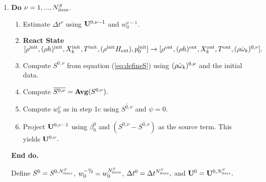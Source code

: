\begin{enumerate}
\renewcommand{\theenumi}{{\bf \alph{enumi}}}
\renewcommand{\labelenumii}{\roman{enumii}.}

\item {\bf Do} {$\nu = 1,...,N_{\rm iters}^{S}$.}
  \begin{enumerate}

  \item Estimate $\Delta t^\nu$ using ${\bf U}^{0,\nu-1}$ and $w_0^{\nu-1}.$

  \item {\bf React State}$[ \rho^{\mathrm{init}},(\rho h)^{\mathrm{init}}, X_k^{\mathrm{init}}, T^{\mathrm{init}}, 
(\rho^{\mathrm{init}} {H_{\rm ext}}), p_0^{\mathrm{init}}] \rightarrow [\rho^{\mathrm{out}}, (\rho h)^{\mathrm{out}}, 
X_k^{\mathrm{out}}, T^{\mathrm{out}}, (\rho \dot{\omega}_k)^{0,\nu} ].$

  \item Compute $S^{0,\nu}$ from equation (\ref{eq:defineS}) 
        using $(\rho \dot{\omega}_k)^{0,\nu}$ and the initial data.

  \item Compute $\overline{S^{0,\nu}} = {\mathrm{\bf Avg}} (S^{0,\nu}).$

  \item Compute $w_0^{\nu}$ as in step 1c using $\overline{S^{0,\nu}}$ and $\psi=0$.
        
  \item Project ${\bf U}^{0,\nu-1}$ using $\beta_0^0$ and 
        $(S^{0,\nu} - \overline{S^{0,\nu}})$ as the source term.  
        This yields ${\bf U}^{0,\nu}.$

  \end{enumerate}

  {\bf End do.}

  Define $S^0 = S^{0,N_{\rm iters}^S}$, $w_0^{-\myhalf} = w_0^{N_{\rm iters}^S}$, 
$\Delta t^0 = \Delta t^{N_{\rm iters}^S},$ and ${\bf U}^0 = {\bf U}^{0,N_{\rm iters}^S}.$

\end{enumerate}

